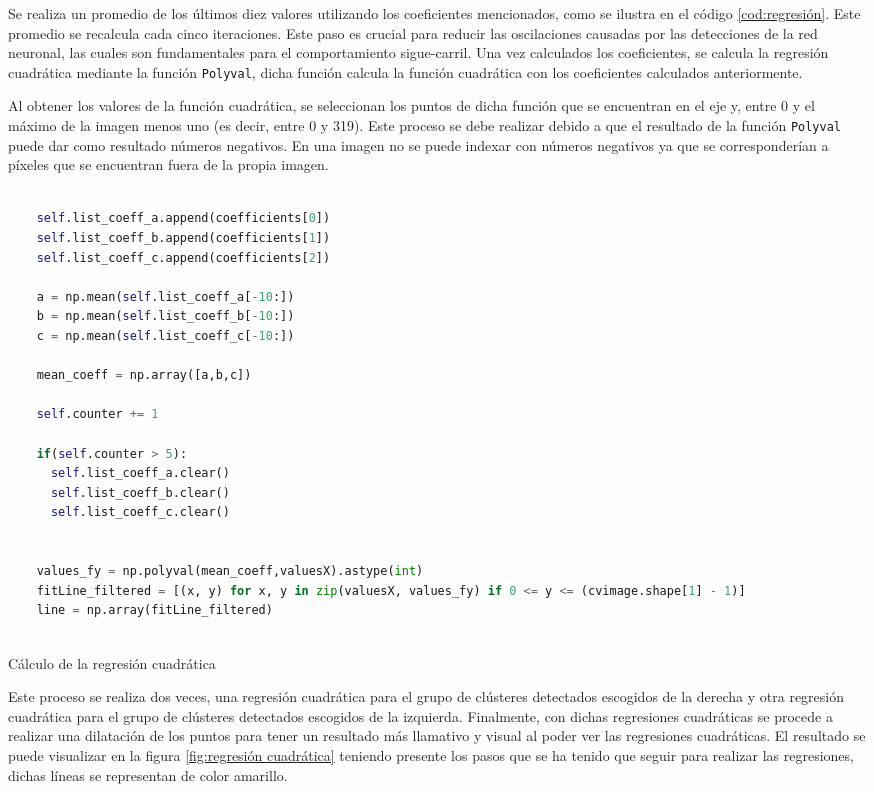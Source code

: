 Se realiza un promedio de los últimos diez valores utilizando los coeficientes mencionados, como se ilustra en el código \ref{cod:regresión}. Este promedio se recalcula 
cada cinco iteraciones. Este paso es crucial para reducir las oscilaciones causadas por las detecciones de la red neuronal, las cuales son fundamentales para el comportamiento sigue-carril. Una vez calculados los 
coeficientes, se calcula la regresión cuadrática mediante la función \texttt{Polyval}, dicha función calcula
la función cuadrática con los coeficientes calculados anteriormente. \newline 

Al obtener los valores de la función cuadrática, se seleccionan los puntos de dicha función que se encuentran en el eje y, entre 0 y el máximo de la imagen menos uno (es decir, entre 0 y 319). 
Este proceso se debe realizar debido a que el resultado de la función \texttt{Polyval} puede dar como resultado números negativos. En una imagen no se puede indexar con números negativos ya que 
se corresponderían a píxeles que se encuentran fuera de la propia imagen. \newline

\begin{code}[H]
  \begin{lstlisting}[language=Python]

    self.list_coeff_a.append(coefficients[0])
    self.list_coeff_b.append(coefficients[1])
    self.list_coeff_c.append(coefficients[2])

    a = np.mean(self.list_coeff_a[-10:])
    b = np.mean(self.list_coeff_b[-10:])
    c = np.mean(self.list_coeff_c[-10:])

    mean_coeff = np.array([a,b,c])

    self.counter += 1

    if(self.counter > 5):
      self.list_coeff_a.clear()
      self.list_coeff_b.clear()
      self.list_coeff_c.clear()  


    values_fy = np.polyval(mean_coeff,valuesX).astype(int)
    fitLine_filtered = [(x, y) for x, y in zip(valuesX, values_fy) if 0 <= y <= (cvimage.shape[1] - 1)]
    line = np.array(fitLine_filtered)
   

  \end{lstlisting}
  \caption[Cálculo de la regresión cuadrática]{Cálculo de la regresión cuadrática}
  \label{cod:regresión}
  \end{code}  

Este proceso se realiza dos veces, una regresión cuadrática para el grupo de clústeres detectados escogidos de la derecha y otra regresión cuadrática para el grupo de clústeres detectados
escogidos de la izquierda. \newline
Finalmente, con dichas regresiones cuadráticas se procede a realizar una dilatación de los puntos para tener un resultado más llamativo y visual al poder
ver las regresiones cuadráticas. El resultado se puede visualizar en la figura \ref{fig:regresión cuadrática} teniendo presente los pasos que se ha tenido que seguir para 
realizar las regresiones, dichas líneas se representan de color amarillo.

